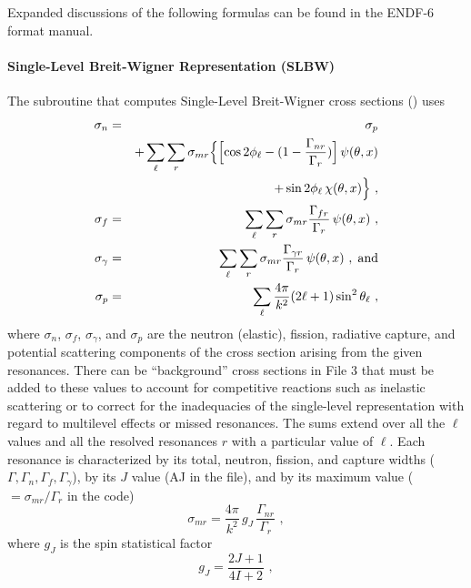 Expanded discussions of the following formulas can be found in the
ENDF-6 format manual\cite{ENDF102}.

\paragraph{Single-Level Breit-Wigner Representation (SLBW)}
The subroutine that computes Single-Level Breit-Wigner cross
sections
() uses
\begin{eqnarray}
  \sigma_n&=&\sigma_p\nonumber\\
      & &+\sum_{\ell}\sum_r\sigma_{mr}
    \Bigl\lbrace \Bigl[ \cos 2\phi_\ell - (1-{{\Gamma_{nr}}
    \over {\Gamma_r}}) \Bigr] \,\psi(\theta,x)\nonumber\\
    & &+\sin 2\phi_\ell \,\chi(\theta,x) \Bigr\rbrace\,\,,\\
  \sigma_f&=&\sum_{\ell}\sum_r \sigma_{mr} {{\Gamma_{fr}}
     \over{\Gamma_r}}\,\psi(\theta,x)\,\,,\\
  \sigma_\gamma&=&\sum_{\ell}\sum_r\sigma_{mr} {{\Gamma_{\gamma r}}
     \over {\Gamma_r}} \,\psi(\theta,x)\,\,,\;\hbox{and}\\
  \sigma_p&=&\sum_\ell {{4\pi}\over{k^2}}(2\ell+1)\sin^2
     \theta_\ell \,\,,
\end{eqnarray}
where $\sigma_n$, $\sigma_f$, $\sigma_\gamma$, and $\sigma_p$ are
the neutron (elastic), fission, radiative capture, and potential
scattering components of the cross section arising from the given
resonances.  There can be ``background'' cross sections in File 3
that must be added to these values to account for competitive
reactions such as inelastic scattering or to correct for the
inadequacies of the single-level representation with regard to
multilevel effects or missed resonances.  The sums extend over
all the $\ell$ values and all the resolved resonances $r$ with a
particular value of $\ell$.  Each resonance is characterized by
its total, neutron, fission, and capture widths ($\Gamma,
\Gamma_n, \Gamma_f, \Gamma_\gamma$), by its $J$ value (AJ in the
file), and by its maximum value ($=\sigma_{mr} /
\Gamma_r$ in the code)
\begin{equation}
   \sigma_{mr} = {\frac{4\pi}{k^2}}\,g_J \,{\frac{\Gamma_{nr}}
      {\Gamma_r}} \,\,,
\end{equation}
where $g_J$ is the spin statistical factor
\begin{equation}
   g_J={\frac{2J+1}{4I+2}}\,\,,
\end{equation}
